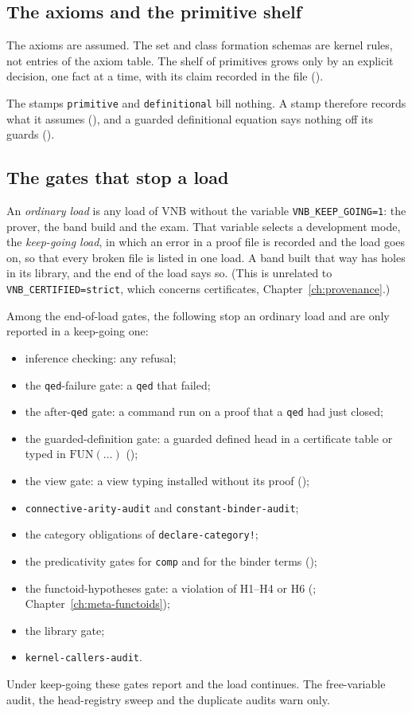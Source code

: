 \subsection{The axioms and the primitive shelf}

The axioms are assumed.  The set and class formation schemas are kernel
rules, not entries of the axiom table.  The shelf of primitives grows
only by an explicit decision, one fact at a time, with its claim
recorded in the file ().

The stamps \texttt{primitive} and \texttt{definitional} bill nothing.  A
stamp therefore records what it assumes (), and a guarded
definitional equation says nothing off its guards ().

\subsection{The gates that stop a load}\label{sec:meta-gates}

An \emph{ordinary load} is any load of VNB without the variable
\texttt{VNB\_KEEP\_GOING=1}: the prover, the band build and the exam.
That variable selects a development mode, the \emph{keep-going load}, in
which an error in a proof file is recorded and the load goes on, so that
every broken file is listed in one load.  A band built that way has holes
in its library, and the end of the load says so.  (This is unrelated to
\texttt{VNB\_CERTIFIED=strict}, which concerns certificates,
Chapter~\ref{ch:provenance}.)

Among the end-of-load gates, the following stop an ordinary load and are
only reported in a keep-going one:
\begin{itemize}
\item inference checking: any refusal;
\item the \texttt{qed}-failure gate: a \texttt{qed} that failed;
\item the after-\texttt{qed} gate: a command run on a proof that a
  \texttt{qed} had just closed;
\item the guarded-definition gate: a guarded defined head in a
  certificate table or typed in $\mathrm{FUN}(\ldots)$ ();
\item the view gate: a view typing installed without its proof ();
\item \texttt{connective-arity-audit} and \texttt{constant-binder-audit};
\item the category obligations of \texttt{declare-category!};
\item the predicativity gates for \texttt{comp} and for the binder terms
  ();
\item the functoid-hypotheses gate: a violation of H1--H4 or H6
  (; Chapter~\ref{ch:meta-functoids});
\item the library gate;
\item \texttt{kernel-callers-audit}.
\end{itemize}
Under keep-going these gates report and the load continues.  The
free-variable audit, the head-registry sweep and the duplicate audits
warn only.

